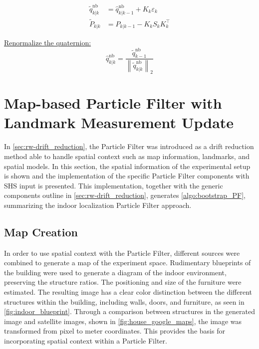 \begin{algorithm}[H]
{\begin{subequations}
			
			\begin{align}
				\tilde{q}_{k | k}^{\mathrm{nb}} &=\hat{q}_{k | k-1}^{\mathrm{nb}}+K_{k} \varepsilon_{k} \\
				\tilde{P}_{k | k} &=P_{k | k-1}-K_{k} S_{k} K_{k}^{\top}
			\end{align}
			
		\end{subequations}		
		
		\underline{Renormalize the quaternion:}
		\begin{equation}
			\hat{q}_{k | k}^{\mathrm{nb}}=\frac{\tilde{q}_{k-1}^{\mathrm{nb}}}{\left\|\tilde{q}_{k | k}^{\mathrm{nb}}\right\|_{2}}
		\end{equation}		
	}	
\end{algorithm}
\restoregeometry
\section{Map-based Particle Filter with Landmark Measurement Update}
\label{sec:method-particle_filter}
In \cref{sec:rw-drift_reduction}, the Particle Filter was introduced as a drift reduction method able to handle spatial context such as map information, landmarks, and spatial models. In this section, the spatial information of the experimental setup is shown and the implementation of the specific Particle Filter components with \ac{SHS} input is presented. This implementation, together with the generic components outline in \cref{sec:rw-drift_reduction}, generates 
\cref{algo:bootstrap_PF}, summarizing the indoor localization Particle Filter approach.

\subsection{Map Creation}
In order to use spatial context with the Particle Filter, different sources were combined to generate a map of the experiment space. Rudimentary blueprints of the building were used to generate a diagram of the indoor environment, preserving the structure ratios. The positioning and size of the furniture were estimated. The resulting image has a clear color distinction between the different structures within the building, including walls, doors, and furniture, as seen in \cref{fig:indoor_blueprint}. Through a comparison between structures in the generated image and satellite images, shown in \cref{fig:house_google_maps}, the image was transformed from pixel to meter coordinates. This provides the basis for incorporating spatial context within a Particle Filter.

